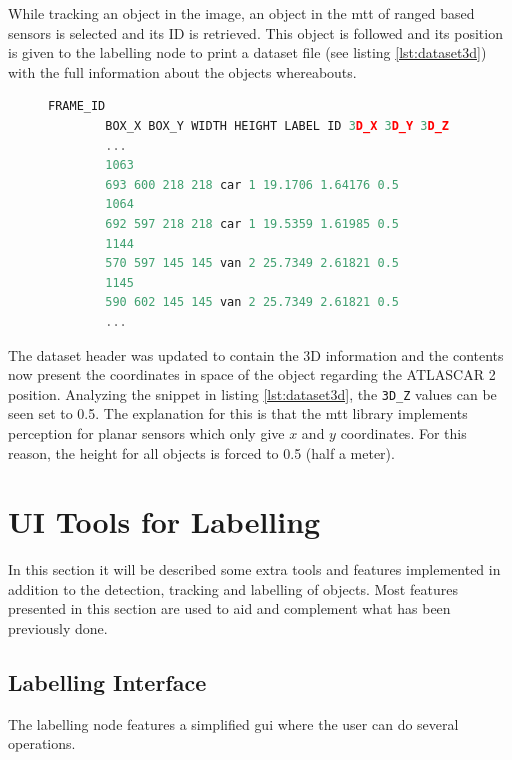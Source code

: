 While tracking an object in the image, an object in the \gls{mtt} of ranged based sensors is selected and its ID is retrieved. This object is followed and its position is given to the labelling node to print a dataset file (see listing \ref{lst:dataset3d}) with the full information about the objects whereabouts.

\begin{figure}
	\begin{center}
		\begin{lstlisting}[label={lst:dataset3d}, caption={Snippet of the dataset with 3D capabilities},language=c++]
		FRAME_ID
		BOX_X BOX_Y WIDTH HEIGHT LABEL ID 3D_X 3D_Y 3D_Z
		...
		1063
		693 600 218 218 car 1 19.1706 1.64176 0.5
		1064
		692 597 218 218 car 1 19.5359 1.61985 0.5
		1144
		570 597 145 145 van 2 25.7349 2.61821 0.5
		1145
		590 602 145 145 van 2 25.7349 2.61821 0.5
		...		\end{lstlisting}
	\end{center}
\end{figure}

The dataset header was updated to contain the 3D information and the contents now present the coordinates in space of the object regarding the ATLASCAR 2 position. Analyzing the snippet in listing \ref{lst:dataset3d}, the \texttt{3D\_Z} values can be seen set to 0.5. The explanation for this is that the \gls{mtt} library implements perception for planar sensors which only give $x$ and $y$ coordinates. For this reason, the height for all objects is forced to 0.5 (half a meter). 

\section{UI Tools for Labelling}

In this section it will be described some extra tools and features implemented in addition to the detection, tracking and labelling of objects. Most features presented in this section are used to aid and complement what has been previously done.

\subsection{Labelling Interface}

The labelling node features a simplified \gls{gui} where the user can do several operations.

